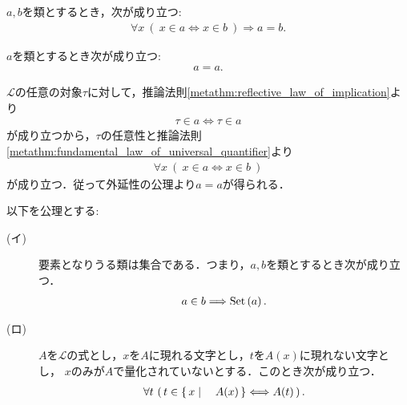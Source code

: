 	\begin{screen}
		\begin{axm}[外延性の公理]
			$a,b$を類とするとき，次が成り立つ:
			\begin{align}
				\forall x\ (\ x \in a  \Longleftrightarrow x \in b\ )
				\Longrightarrow a=b.
			\end{align}
		\end{axm}
	\end{screen}
	
	\begin{screen}
		\begin{thm}[任意の類は自分自身と等しい]\label{thm:any_class_equals_to_itself}
			$a$を類とするとき次が成り立つ:
			\begin{align}
				a = a.
			\end{align}
		\end{thm}
	\end{screen}
	
	\begin{prf}
		$\mathcal{L}$の任意の対象$\tau$に対して，推論法則\ref{metathm:reflective_law_of_implication}より
		\begin{align}
			\tau \in a \Longleftrightarrow \tau \in a
		\end{align}
		が成り立つから，$\tau$の任意性と推論法則\ref{metathm:fundamental_law_of_universal_quantifier}より
		\begin{align}
			\forall x\ (\ x \in a  \Longleftrightarrow x \in b\ )
		\end{align}
		が成り立つ．従って外延性の公理より$a = a$が得られる．
		\QED
	\end{prf}
	
	\begin{screen}
		\begin{axm}[類の公理] 以下を公理とする:
			\begin{description}
				\item[(イ)] 要素となりうる類は集合である．つまり，$a,b$を類とするとき次が成り立つ．
					\begin{align}
						a \in b \Longrightarrow \operatorname*{Set} \left(a\right).
					\end{align}
					
					
				\item[(ロ)] $A$を$\mathcal{L}$の式とし，$x$を$A$に現れる文字とし，$t$を$A(x)$に現れない文字とし，
					$x$のみが$A$で量化されていないとする．このとき次が成り立つ．
					\begin{align}
						\forall t\, \left(\, t \in \left\{\, x \mid \quad A(x)\, \right\} \Longleftrightarrow A(t)\, \right).
					\end{align}
			\end{description}
		\end{axm}
	\end{screen}
	
